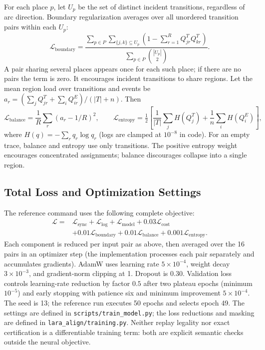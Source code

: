 \documentclass[11pt]{article}
\begin{document}
For each place $p$, let $U_p$ be the set of distinct incident transitions,
regardless of arc direction. Boundary regularization averages over all
unordered transition pairs within each $U_p$:
\[
 \mathcal L_{\mathrm{boundary}}=
 \frac{\displaystyle\sum_{p\in P}\sum_{\{j,k\}\subseteq U_p}
       \left(1-\sum_{r=1}^R Q^T_{jr}Q^T_{kr}\right)}
      {\displaystyle\sum_{p\in P}\binom{|U_p|}{2}}.
\]
A pair sharing several places appears once for each such place; if there are
no pairs the term is zero. It encourages incident transitions to share regions.
Let the mean region load over transitions and events be
$a_r=(\sum_j Q^T_{jr}+\sum_i Q^E_{ir})/(|T|+n)$. Then
\[
 \mathcal L_{\mathrm{balance}}=\frac1R\sum_r(a_r-1/R)^2,\qquad
 \mathcal L_{\mathrm{entropy}}=\tfrac12
 \left[\frac1{|T|}\sum_j H(Q^T_j)+\frac1n\sum_i H(Q^E_i)\right],
\]
where $H(q)=-\sum_r q_r\log q_r$ (logs are clamped at $10^{-8}$ in code).
For an empty trace, balance and entropy use only transitions. The positive
entropy weight encourages concentrated assignments; balance discourages
collapse into a single region.

\subsection{Total Loss and Optimization Settings}

The reference command uses the following complete objective:
\[
\begin{split}
\mathcal L={}&\mathcal L_{\mathrm{sync}}+\mathcal L_{\mathrm{log}}
 +\mathcal L_{\mathrm{model}}+0.03\mathcal L_{\mathrm{cost}}\\
 &+0.01\mathcal L_{\mathrm{boundary}}+0.01\mathcal L_{\mathrm{balance}}
 +0.001\mathcal L_{\mathrm{entropy}}.
\end{split}
\]
Each component is reduced per input pair as above, then averaged over the
16 pairs in an optimizer step (the implementation processes each pair
separately and accumulates gradients). AdamW uses learning rate $5\times10^{-4}$,
weight decay $3\times10^{-3}$, and gradient-norm clipping at 1. Dropout is
$0.30$. Validation loss controls learning-rate reduction by factor $0.5$ after
two plateau epochs (minimum $10^{-5}$) and early stopping with patience six
and minimum improvement $5\times10^{-4}$. The seed is 13; the reference run
executes 50 epochs and selects epoch 49. The settings are defined in
\texttt{scripts/train\_model.py}; the loss reductions and masking are defined in
\texttt{lara\_align/training.py}. Neither replay legality nor exact certification
is a differentiable training term: both are explicit semantic checks outside
the neural objective.
\end{document}
